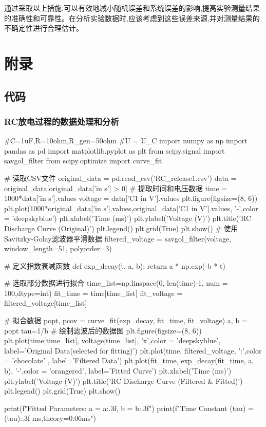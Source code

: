 \documentclass[UTF8]{ctexart}
\begin{document}
通过采取以上措施,可以有效地减小随机误差和系统误差的影响,提高实验测量结果的准确性和可靠性。在分析实验数据时,应该考虑到这些误差来源,并对测量结果的不确定性进行合理估计。


\newpage

\section{附录}
\subsection{代码}
\subsubsection{RC放电过程的数据处理和分析}
\begin{python}
#C=1uF,R=10ohm,R_gen=50ohm
#U = U_C
import numpy as np
import pandas as pd
import matplotlib.pyplot as plt
from scipy.signal import savgol_filter
from scipy.optimize import curve_fit

# 读取CSV文件
original_data = pd.read_csv('RC_release1.csv')  
data = original_data[original_data['in s'] > 0]
# 提取时间和电压数据
time = 1000*data['in s'].values
voltage = data['C1 in V'].values
plt.figure(figsize=(8, 6))
plt.plot(1000*original_data['in s'].values,original_data['C1 in V'].values, '-',color = 'deepskyblue')
plt.xlabel('Time (ms)')
plt.ylabel('Voltage (V)')
plt.title('RC Discharge Curve (Original)')
plt.legend()
plt.grid(True)
plt.show()
# 使用Savitzky-Golay滤波器平滑数据
filtered_voltage = savgol_filter(voltage, window_length=51, polyorder=3)



# 定义指数衰减函数
def exp_decay(t, a, b):
    return a * np.exp(-b * t)

# 选取部分数据进行拟合
time_list=np.linspace(0, len(time)-1, num = 100,dtype=int)
fit_time = time[time_list]
fit_voltage = filtered_voltage[time_list]

# 拟合数据
popt, pcov = curve_fit(exp_decay, fit_time, fit_voltage)
a, b = popt
tau=1/b
# 绘制滤波后的数据图
plt.figure(figsize=(8, 6))
plt.plot(time[time_list], voltage[time_list], 'x',color = 'deepskyblue', label='Original Data(selected for fitting)')
plt.plot(time, filtered_voltage, ':',color = 'chocolate' , label='Filtered Data')
plt.plot(fit_time, exp_decay(fit_time, a, b), '-',color = 'orangered', label='Fitted Curve')
plt.xlabel('Time (ms)')
plt.ylabel('Voltage (V)')
plt.title('RC Discharge Curve (Filtered & Fitted)')
plt.legend()
plt.grid(True)
plt.show()

print(f"Fitted Parameters: a = {a:.3f}, b = {b:.3f}")
print(f"Time Constant (tau) = {(tau):.3f} ms,theory=0.06ms")



\end{python}
\end{document}
